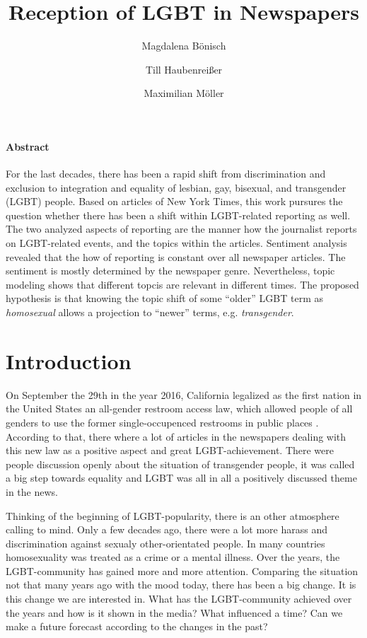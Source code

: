 \documentclass[10pt,a4paper,twocolumn]{scrartcl}
\title{Reception of LGBT in Newspapers}
\author{Magdalena Bönisch \and Till Haubenreißer \and Maximilian Möller}
\begin{document}
\onehalfspacing

\maketitle

{\footnotesize
\paragraph*{Abstract} For the last decades, there has been a rapid shift from discrimination and exclusion to integration and equality of lesbian, gay, bisexual, and transgender (LGBT) people. Based on articles of New York Times, this work pursures the question whether there has been a shift within LGBT-related reporting as well. The two analyzed aspects of reporting are the manner how the journalist reports on LGBT-related events, and the topics within the articles. Sentiment analysis revealed that the how of reporting is constant over all newspaper articles. The sentiment is mostly determined by the newspaper genre. Nevertheless, topic modeling shows that different topcis are relevant in different times. The proposed hypothesis is that knowing the topic shift of some ``older'' LGBT term as \textit{homosexual} allows a projection to ``newer'' terms, e.g. \textit{transgender}.
}


\section{Introduction}
On September the 29th in the year 2016, California legalized as the first nation in the United States an all-gender restroom access law, which allowed people of all genders to use the former single-occupenced restrooms in public places \citep{Ring:2016}. According to that, there where a lot of articles in the newspapers dealing with this new law as a positive aspect and great LGBT-achievement. There were people discussion openly about the situation of transgender people, it was called a big step towards equality and LGBT was all in all a positively discussed theme in the news.

Thinking of the beginning of LGBT-popularity, there is an other atmosphere calling to mind. Only a few decades ago, there were a lot more harass and discrimination against sexualy other-orientated people. In many countries homosexuality was treated as a crime or a mental illness. Over the years, the LGBT-community has gained more and more attention. Comparing the situation not that many years ago with the mood today, there has been a big change. It is this change we are interested in. What has the LGBT-community achieved over the years and how is it shown in the media? What influenced a time? Can we make a future forecast according to the changes in the past?
\end{document}
